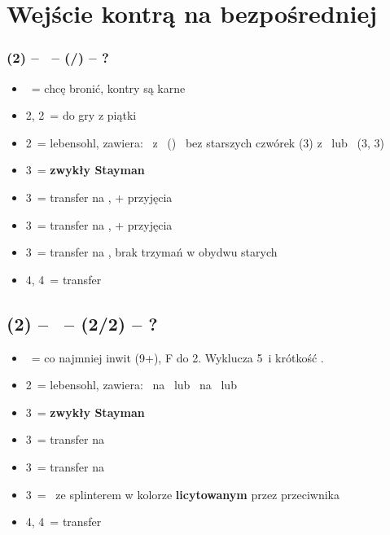 \documentclass[12pt, a4paper]{article}
\begin{document}
\pagebreak


\section{Wejście kontrą na bezpośredniej}
\subsubsection*{(2\diams) -- \dbl\ -- (\rdbl/\passx) -- ?}
\begin{itemize}
    \item \pass\ = chcę bronić, kontry są karne
    \item 2\hearts, 2\spades\ = do gry z piątki
    \item 2\nt\ = lebensohl, zawiera:
    \subitem \soff\ z \clubs\ (\pass)
    \subitem \gf\ bez starszych czwórek (3\diams) \vimp
    \subitem \inv z \hearts\ lub \spades\ (3\hearts, 3\spades)
    \item 3\clubs\ = \textbf{zwykły Stayman} \vimp
    \item 3\diams\ = transfer na \hearts, \gf + przyjęcia
    \item 3\hearts\ = transfer na \spades, \gf + przyjęcia \br
    \item 3\spades\ = transfer na \nt, brak trzymań w obydwu starych
    \item 4\diams, 4\hearts\ = transfer
\end{itemize}


\subsection*{(2\diams) -- \dbl\ -- (2\hearts/2\spades) -- ?}
\begin{itemize}
    \item \dbl\ = co najmniej inwit (9+), F do 2\nt. Wyklucza 5\hearts\spades\ i krótkość \hearts\spades.
    \item 2\nt\ = lebensohl, zawiera:
    \subitem \soff\ na \clubs\ lub \diams
    \subitem \inv\ na \hearts\ lub \spades
    \item 3\clubs\ = \textbf{zwykły Stayman} \vimp
    \item 3\diams\ = transfer na \hearts\ \gf
    \item 3\hearts\ = transfer na \spades\ \gf
    \item 3\spades\ = \gf\ ze splinterem w kolorze \textbf{licytowanym} przez przeciwnika
    \item 4\diams, 4\hearts\ = transfer
\end{itemize}
\end{document}
